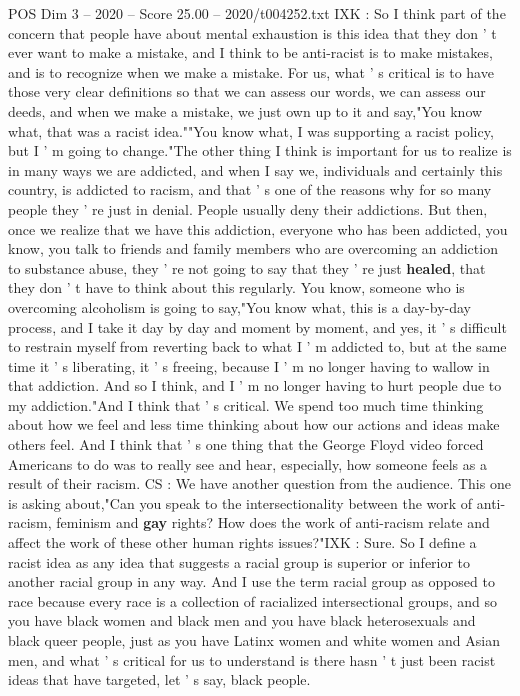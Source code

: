 \begin{textsample}{POS Dim 3 – 2020 – Score 25.00 – 2020/t004252.txt}
IXK : So I think part of the concern that people have about mental exhaustion is this idea that they don ' t ever want to make a mistake, and I think to be anti-racist is to make mistakes, and is to recognize when we make a mistake.
For us, what ' s critical is to have those very clear definitions so that we can assess our words, we can assess our deeds, and when we make a mistake, we just own up to it and say,"You know what, that was a racist idea.""You know what, I was supporting a racist policy, but I ' m going to change."The other thing I think is important for us to realize is in many ways we are addicted, and when I say we, individuals and certainly this country, is addicted to racism, and that ' s one of the reasons why for so many people they ' re just in denial.
People usually deny their addictions.
But then, once we realize that we have this addiction, everyone who has been addicted, you know, you talk to friends and family members who are overcoming an addiction to substance abuse, they ' re not going to say that they ' re just \textbf{healed}, that they don ' t have to think about this regularly.
You know, someone who is overcoming alcoholism is going to say,"You know what, this is a day-by-day process, and I take it day by day and moment by moment, and yes, it ' s difficult to restrain myself from reverting back to what I ' m addicted to, but at the same time it ' s liberating, it ' s freeing, because I ' m no longer having to wallow in that addiction.
And so I think, and I ' m no longer having to hurt people due to my addiction."And I think that ' s critical.
We spend too much time thinking about how we feel and less time thinking about how our actions and ideas make others feel.
And I think that ' s one thing that the George Floyd video forced Americans to do was to really see and hear, especially, how someone feels as a result of their racism.
CS : We have another question from the audience.
This one is asking about,"Can you speak to the intersectionality between the work of anti-racism, feminism and \textbf{gay} rights?
How does the work of anti-racism relate and affect the work of these other human rights issues?"IXK : Sure.
So I define a racist idea as any idea that suggests a racial group is superior or inferior to another racial group in any way.
And I use the term racial group as opposed to race because every race is a collection of racialized intersectional groups, and so you have black women and black men and you have black heterosexuals and black queer people, just as you have Latinx women and white women and Asian men, and what ' s critical for us to understand is there hasn ' t just been racist ideas that have targeted, let ' s say, black people.

\end{textsample}
